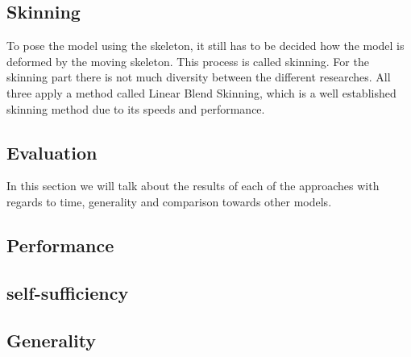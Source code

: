 \documentclass{article}
\begin{document}
%

\subsection{Skinning}
To pose the model using the skeleton, it still has to be decided how the model
is deformed by the moving skeleton. This process is called skinning. For the
skinning part there is not much diversity between the different researches. All
three apply a method called Linear Blend Skinning, which is a well established skinning method due
to its speeds and performance.




\subsection{Evaluation}
In this section we will talk about the results of each of the approaches with
regards to time, generality and comparison towards other models.

\subsection{Performance}
\subsection{self-sufficiency}
\subsection{Generality}
\end{document}
